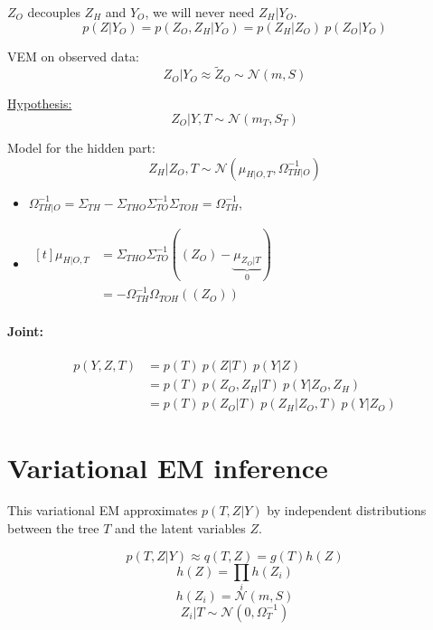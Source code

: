 \documentclass[11pt,a4paper]{article}
\begin{document}
$Z_O$ decouples $Z_H$ and $Y_O$, we will never need $Z_H|Y_O$.
$$ p(Z|Y_O) = p(Z_O,Z_H | Y_O) = p(Z_H|Z_O) \: p(Z_O|Y_O) $$


VEM on observed data: $$Z_O|Y_O \approx \widetilde{Z}_O \sim \mathcal{N}(m,S)$$

\underline{ Hypothesis:}
$$ Z_O|Y,T \sim \mathcal{N}(m_T,S_T)$$

Model for the hidden part: $$Z_H|Z_O,T \sim \mathcal{N}(\mu_{H|O,T}, \Omega_{TH|O}^{-1})$$ 

\begin{itemize}
\item $\Omega_{TH|O}^{-1} = \Sigma_{TH} -\Sigma_{THO}\Sigma_{TO}^{-1}\Sigma_{TOH} = \Omega_{TH}^{-1}$, 

\item$ \displaystyle\begin{aligned}[t]
\mu_{H|O,T} &= \Sigma_{THO}\Sigma_{TO}^{-1}((Z_O)-\underbrace{\mu_{Z_O|T}}_{0}) \\
 &= -\Omega_{TH}^{-1}\Omega_{TOH}((Z_O))
\end{aligned}$\\
\end{itemize}


\paragraph{Joint:}
\begin{align*}
p(Y,Z,T)& = p(T) \: p(Z|T) \: p(Y|Z) \\
&= p(T)\: p(Z_O,Z_H|T) \: p(Y|Z_O,Z_H) \\
&= p(T) \: p(Z_O|T) \: p(Z_H | Z_O,T)  \: p(Y|Z_O)
\end{align*} 
\section{Variational EM inference}

This variational EM approximates $p(T,Z | Y)$ by independent distributions between the tree $T$ and the latent variables $Z$.

$$p(T,Z | Y) \approx q(T,Z) = g(T)h(Z)$$
$$ h(Z) = \prod_i h(Z_i)$$
$$ h(Z_i) =  \mathcal{N}(m,S) $$
$$Z_i|T \sim \mathcal{N}(0,\Omega_T^{-1})$$
\end{document}
